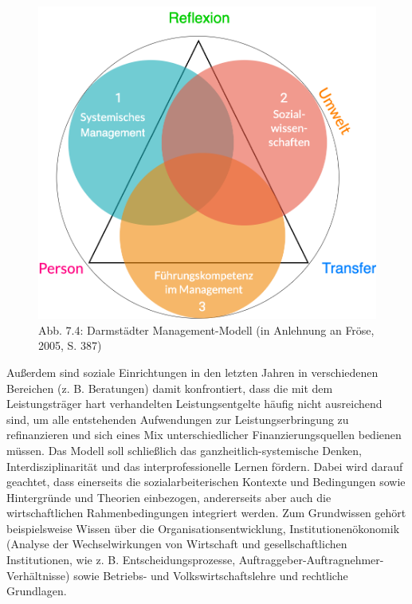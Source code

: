 \documentclass[
  letterpaper,
]{book}
\begin{document}
\begin{figure}

\includegraphics[width=0.75\linewidth,height=\textheight,keepaspectratio]{images/figure74.png} \hfill{}

\caption{Abb. 7.4: Darmstädter Management-Modell (in Anlehnung an Fröse,
2005, S. 387)}

\end{figure}%

Außerdem sind soziale Einrichtungen in den letzten Jahren in
verschiedenen Bereichen (z. B. Beratungen) damit konfrontiert, dass die
mit dem Leistungsträger hart verhandelten Leistungsentgelte häufig nicht
ausreichend sind, um alle entstehenden Aufwendungen zur
Leistungserbringung zu refinanzieren und sich eines Mix
unterschiedlicher Finanzierungsquellen bedienen müssen. Das Modell soll
schließlich das ganzheitlich-systemische Denken, Interdisziplinarität
und das interprofessionelle Lernen fördern. Dabei wird darauf geachtet,
dass einerseits die sozialarbeiterischen Kontexte und Bedingungen sowie
Hintergründe und Theorien einbezogen, andererseits aber auch die
wirtschaftlichen Rahmenbedingungen integriert werden. Zum Grundwissen
gehört beispielsweise Wissen über die Organisationsentwicklung,
Institutionenökonomik (Analyse der Wechselwirkungen von Wirtschaft und
gesellschaftlichen Institutionen, wie z. B. Entscheidungsprozesse,
Auftraggeber-Auftragnehmer-Verhältnisse) sowie Betriebs- und
Volkswirtschaftslehre und rechtliche Grundlagen.
\end{document}
